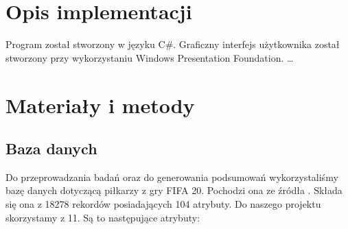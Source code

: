 \documentclass{classrep}
\begin{document}
	\section{Opis implementacji} %
	Program został stworzony w języku C\#. Graficzny interfejs użytkownika został stworzony przy wykorzystaniu Windows Presentation Foundation. \ldots 
	
	\section{Materiały i metody} %
	\subsection{Baza danych}
	Do przeprowadzania badań oraz do generowania podsumowań wykorzystaliśmy bazę danych dotyczącą piłkarzy z gry FIFA 20. Pochodzi ona ze źródła \cite{baza}. Składa się ona z 18278 rekordów posiadających 104 atrybuty. Do naszego projektu skorzystamy z 11. Są to następujące atrybuty:
	
\end{document}
